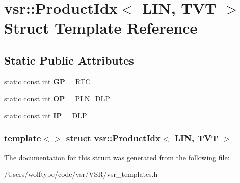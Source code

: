 \hypertarget{structvsr_1_1_product_idx_3_01_l_i_n_00_01_t_v_t_01_4}{\section{vsr\-:\-:Product\-Idx$<$ L\-I\-N, T\-V\-T $>$ Struct Template Reference}
\label{structvsr_1_1_product_idx_3_01_l_i_n_00_01_t_v_t_01_4}
}
\subsection*{Static Public Attributes}
\begin{DoxyCompactItemize}
\item 
\hypertarget{structvsr_1_1_product_idx_3_01_l_i_n_00_01_t_v_t_01_4_a7ef189e515754709213fd9273da1ecbc}{static const int {\bfseries G\-P} = R\-T\-C}\label{structvsr_1_1_product_idx_3_01_l_i_n_00_01_t_v_t_01_4_a7ef189e515754709213fd9273da1ecbc}

\item 
\hypertarget{structvsr_1_1_product_idx_3_01_l_i_n_00_01_t_v_t_01_4_a4a0a9cd28f5c493f0413420e6d506e1e}{static const int {\bfseries O\-P} = P\-L\-N\-\_\-\-D\-L\-P}\label{structvsr_1_1_product_idx_3_01_l_i_n_00_01_t_v_t_01_4_a4a0a9cd28f5c493f0413420e6d506e1e}

\item 
\hypertarget{structvsr_1_1_product_idx_3_01_l_i_n_00_01_t_v_t_01_4_af01a9a3756b250c7b5286e3d66cfe637}{static const int {\bfseries I\-P} = D\-L\-P}\label{structvsr_1_1_product_idx_3_01_l_i_n_00_01_t_v_t_01_4_af01a9a3756b250c7b5286e3d66cfe637}

\end{DoxyCompactItemize}
\subsubsection*{template$<$$>$ struct vsr\-::\-Product\-Idx$<$ L\-I\-N, T\-V\-T $>$}



The documentation for this struct was generated from the following file\-:\begin{DoxyCompactItemize}
\item 
/\-Users/wolftype/code/vsr/\-V\-S\-R/vsr\-\_\-templates.\-h\end{DoxyCompactItemize}
